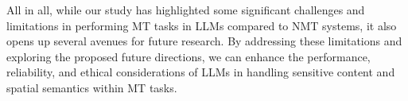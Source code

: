 All in all, while our study has highlighted some significant challenges and limitations in performing MT tasks in LLMs compared to NMT systems, it also opens up several avenues for future research. By addressing these limitations and exploring the proposed future directions, we can enhance the performance, reliability, and ethical considerations of LLMs in handling sensitive content and spatial semantics within MT tasks.









